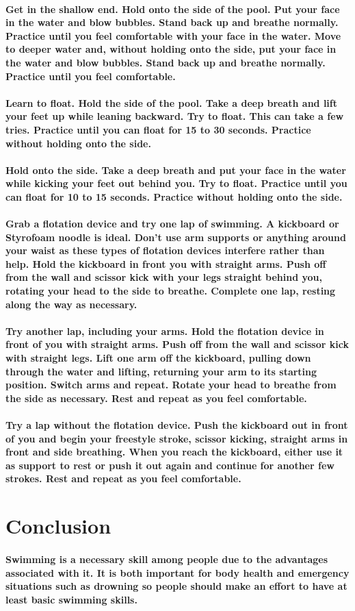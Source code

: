 \documentclass[a4paper,10.9pt]{article}
\begin{document}
\paragraph{Get in the shallow end. Hold onto the side of the pool. Put your face in the water and blow bubbles. Stand back up and breathe normally. Practice until you feel comfortable with your face in the water. Move to deeper water and, without holding onto the side, put your face in the water and blow bubbles. Stand back up and breathe normally. Practice until you feel comfortable.}
\paragraph{Learn to float. Hold the side of the pool. Take a deep breath and lift your feet up while leaning backward. Try to float. This can take a few tries. Practice until you can float for 15 to 30 seconds. Practice without holding onto the side. }
\paragraph{Hold onto the side. Take a deep breath and put your face in the water while kicking your feet out behind you. Try to float. Practice until you can float for 10 to 15 seconds. Practice without holding onto the side.}
\paragraph{Grab a flotation device and try one lap of swimming. A kickboard or Styrofoam noodle is ideal. Don't use arm supports or anything around your waist as these types of flotation devices interfere rather than help. Hold the kickboard in front you with straight arms. Push off from the wall and scissor kick with your legs straight behind you, rotating your head to the side to breathe. Complete one lap, resting along the way as necessary.}
\paragraph{Try another lap, including your arms. Hold the flotation device in front of you with straight arms. Push off from the wall and scissor kick with straight legs. Lift one arm off the kickboard, pulling down through the water and lifting, returning your arm to its starting position. Switch arms and repeat. Rotate your head to breathe from the side as necessary. Rest and repeat as you feel comfortable.}
\paragraph{Try a lap without the flotation device. Push the kickboard out in front of you and begin your freestyle stroke, scissor kicking, straight arms in front and side breathing. When you reach the kickboard, either use it as support to rest or push it out again and continue for another few strokes. Rest and repeat as you feel comfortable.}
\section{Conclusion}
\paragraph{Swimming is a necessary skill among people due to the advantages associated with it. It is both important for body health and emergency situations such as drowning so people should make an effort to have at least basic swimming skills.}
\end{document}
